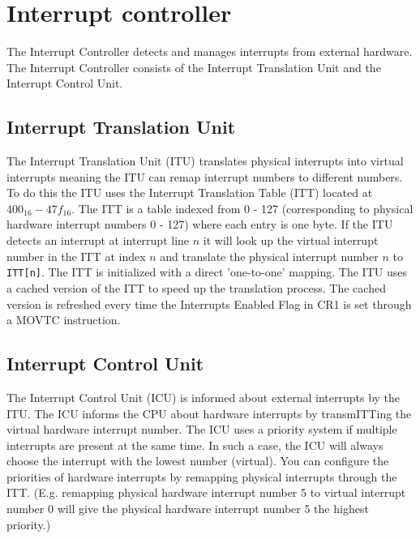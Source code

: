 \section{Interrupt controller}
\label{sec:interruptcontroller}

The Interrupt Controller detects and manages interrupts from external hardware. The Interrupt Controller consists of the Interrupt Translation Unit and the
Interrupt Control Unit. 

\subsection{Interrupt Translation Unit}
\label{sec:itu}

The Interrupt Translation Unit (\Gls{ITU}) translates physical interrupts into virtual interrupts meaning the \Gls{ITU} can remap interrupt numbers to different numbers.
To do this the \Gls{ITU} uses the Interrupt Translation Table (\Gls{ITT}) located at $400_{16} - 47f_{16}$. The \Gls{ITT} is a table indexed from 0 - 127 (corresponding to physical hardware
interrupt numbers 0 - 127) where each entry is one byte. If the \Gls{ITU} detects an interrupt at interrupt line $n$ it will look up the virtual interrupt number in the \Gls{ITT}
at index $n$ and translate the physical interrupt number $n$ to \verb|ITT[n]|. The \Gls{ITT} is initialized with a direct 'one-to-one' mapping. The \Gls{ITU} uses a cached
version of the \Gls{ITT} to speed up the translation process. The cached version is refreshed every time the Interrupts Enabled Flag in CR1 is set through a MOVTC instruction. 

\subsection{Interrupt Control Unit}

The Interrupt Control Unit (\Gls{ICU}) is informed about external interrupts by the \Gls{ITU}. The \Gls{ICU} informs the CPU about hardware interrupts by transm\Gls{ITT}ing the virtual hardware
interrupt number. The \Gls{ICU} uses a priority system if multiple interrupts are present at the same time. In such a case, the \Gls{ICU} will always choose the interrupt with the lowest number (virtual). You can configure the priorities of hardware interrupts by remapping physical interrupts through the \Gls{ITT}. (E.g. remapping physical hardware interrupt number 5 to virtual interrupt number 0 will give the physical hardware interrupt number 5 the highest priority.)
